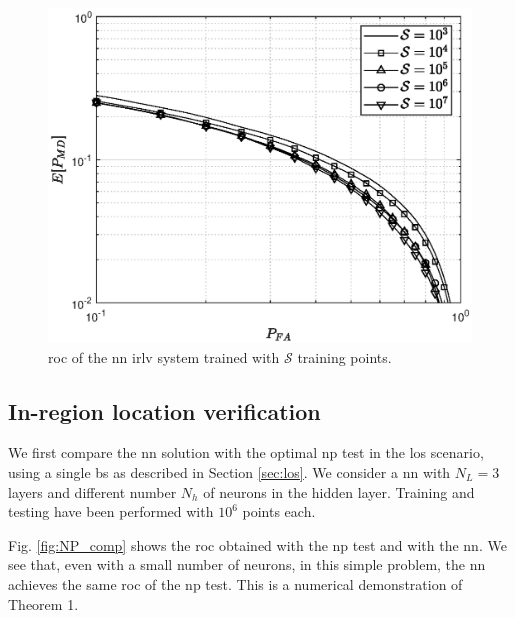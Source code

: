 \documentclass[conference,final]{IEEEtran}
\begin{document}
\begin{figure}[t]
    \centering
    \includegraphics[width=0.9\columnwidth]{res_avg_nTrain.eps}
    \caption{\ac{roc} of the \ac{nn} \ac{irlv} system trained with $\mathcal{S}$ training points.}
    \label{fig:n_train}
\end{figure}

\subsection{In-region location verification}
We first compare the \ac{nn} solution with the optimal \ac{np} test in the \ac{los} scenario, using a single \ac{bs} as described in Section \ref{sec:los}. We consider a \ac{nn} with $N_L=3$ layers and different number $N_h$ of neurons in the hidden layer. Training and testing have been performed with $10^6$ points each. 

Fig. \ref{fig:NP_comp} shows the \ac{roc} obtained with the \ac{np} test and with the \ac{nn}. We see that, even with a small number of neurons, in this simple problem, the \ac{nn} achieves the same \ac{roc} of the \ac{np} test. This is a numerical demonstration of Theorem 1.
\end{document}
